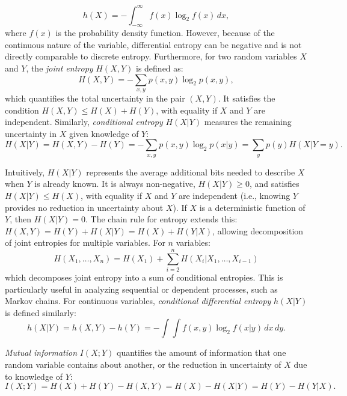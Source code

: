 \begin{equation}
    h(X) = -\int_{-\infty}^{\infty} f(x) \log_2 f(x) \, dx,
\end{equation}
where $f(x)$ is the probability density function. However, because of the continuous nature of the variable, differential entropy can be negative and is not directly comparable to discrete entropy. Furthermore, for two random variables $X$ and $Y$, the \emph{joint entropy} $H(X,Y)$ is defined as:
\begin{equation}
    H(X,Y) = -\sum_{x,y} p(x,y) \log_2 p(x,y),
\end{equation}
which quantifies the total uncertainty in the pair $(X,Y)$. It satisfies the condition $H(X,Y) \leq H(X) + H(Y)$, with equality if $X$ and $Y$ are independent. Similarly, \emph{conditional entropy} $H(X|Y)$ measures the remaining uncertainty in $X$ given knowledge of $Y$:
\begin{equation}
    H(X|Y) = H(X,Y) - H(Y) = -\sum_{x,y} p(x,y) \log_2 p(x|y) = \sum_y p(y) H(X|Y=y).
\end{equation}

Intuitively, $H(X|Y)$ represents the average additional bits needed to describe $X$ when $Y$ is already known. It is always non-negative, $H(X|Y) \geq 0$, and satisfies $H(X|Y) \leq H(X)$, with equality if $X$ and $Y$ are independent (i.e., knowing $Y$ provides no reduction in uncertainty about $X$). If $X$ is a deterministic function of $Y$, then $H(X|Y) = 0$. The chain rule for entropy extends this: $H(X,Y) = H(Y) + H(X|Y) = H(X) + H(Y|X)$, allowing decomposition of joint entropies for multiple variables. For $n$ variables:
\begin{equation}
    H(X_1, \dots, X_n) = H(X_1) + \sum_{i=2}^n H(X_i | X_1, \dots, X_{i-1})
\end{equation}
which decomposes joint entropy into a sum of conditional entropies. This is particularly useful in analyzing sequential or dependent processes, such as Markov chains. %
For continuous variables, \emph{conditional differential entropy} $h(X|Y)$ is defined similarly:
\begin{equation}
    h(X|Y) = h(X,Y) - h(Y) = -\int \int f(x,y) \log_2 f(x|y) \, dx \, dy.
\end{equation}


\emph{Mutual information} $I(X;Y)$ quantifies the amount of information that one random variable contains about another, or the reduction in uncertainty of $X$ due to knowledge of $Y$:
\begin{equation}
    I(X;Y) = H(X) + H(Y) - H(X,Y) = H(X) - H(X|Y) = H(Y) - H(Y|X).
    \label{eq:mutualinfo}
\end{equation}

